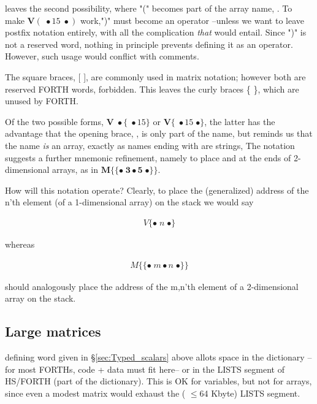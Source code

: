  leaves the second possibility, where "(" becomes part of the array name, . To make $\mathbf V(\;\bullet15\;\bullet)$ work,")" must become an operator --unless we want to leave postfix notation entirely, with all the complication \textit{that} would entail. Since ")" is not a reserved word, nothing in principle prevents defining it as an operator. However, such usage would conflict with comments.

The square braces, [ ], are commonly used in matrix notation; however both are reserved FORTH words, \ie\; forbidden. This leaves the curly braces \{ \}, which are unused by FORTH.

Of the two possible forms, $\mathbf V\;\bullet\{\;\bullet15\}$ or $\mathbf V\{\;\bullet15\;\bullet\}$, the latter has the advantage that the opening brace, \bc{\{}, is only part of the name, but reminds us that the name  \textit{is} an array, exactly as names ending with \bc{\$} are strings, \etc The notation suggests a further mnemonic refinement, namely to place \bc{\{\{} and \bc{\}\}} at the ends of 2-dimensional arrays, as in $\mathbf{M\{\{\bullet \;3 \bullet 5 \;\bullet \}\}}$.

How will this notation operate? Clearly, to place the (generalized) address of the n'th element (of a 1-dimensional array) on the stack we would say

\begin{align*}
    V\{\bullet \;n \;\bullet\}
\end{align*}

whereas

\begin{align*}
    M\{\{ \bullet \;m \bullet n \;\bullet\}\}
\end{align*}

should analogously place the address of the m,n'th element of a 2-dimensional array on the stack.

\subsection{Large matrices}
 defining word  given in \S\ref{sec:Typed_scalars} above allots space in the dictionary --for most FORTHs, code + data must fit here-- or in the LISTS segment of HS/FORTH (part of the dictionary). This is OK for variables, but not for arrays, since even a modest matrix would exhaust the ( $\leq$64 Kbyte) LISTS segment.


